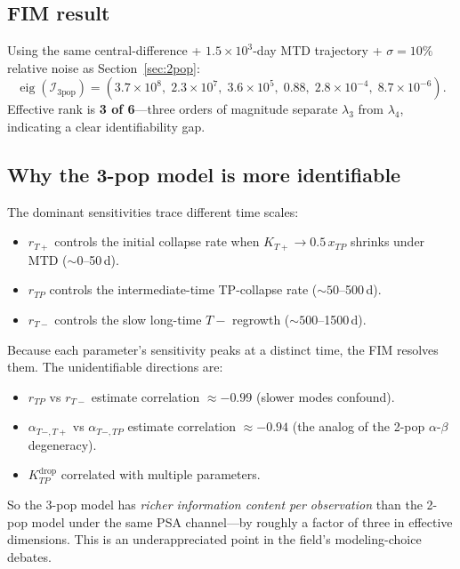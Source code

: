 \documentclass[11pt]{article}
\newcommand{\Kdrop}{K_{TP}^{\text{drop}}}
\newcommand{\Tplus}{T{+}}
\newcommand{\Tminus}{T{-}}
\begin{document}
\subsection{FIM result}

Using the same central-difference + $1.5 \times 10^3$-day MTD trajectory +
$\sigma = 10\%$ relative noise as Section~\ref{sec:2pop}:
\begin{equation}
\operatorname{eig}(\mathcal{I}_{3\text{pop}}) = (3.7 \times 10^8,\; 2.3 \times 10^7,\;
3.6 \times 10^5,\; 0.88,\; 2.8 \times 10^{-4},\; 8.7 \times 10^{-6}).
\label{eq:eig_3pop}
\end{equation}
Effective rank is \textbf{3 of 6}---three orders of magnitude separate
$\lambda_3$ from $\lambda_4$, indicating a clear identifiability gap.

\subsection{Why the 3-pop model is more identifiable}

The dominant sensitivities trace different time scales:
\begin{itemize}
\item $r_{\Tplus}$ controls the initial collapse rate when $K_{\Tplus} \to 0.5\,x_{TP}$ shrinks under MTD ($\sim 0$--50\,d).
\item $r_{TP}$ controls the intermediate-time TP-collapse rate ($\sim 50$--500\,d).
\item $r_{\Tminus}$ controls the slow long-time $\Tminus$ regrowth ($\sim 500$--1500\,d).
\end{itemize}

Because each parameter's sensitivity peaks at a distinct time, the FIM resolves
them. The unidentifiable directions are:
\begin{itemize}
\item $r_{TP}$ vs $r_{\Tminus}$ estimate correlation $\approx -0.99$ (slower modes confound).
\item $\alpha_{\Tminus,\Tplus}$ vs $\alpha_{\Tminus,TP}$ estimate correlation $\approx -0.94$ (the analog of the 2-pop $\alpha$-$\beta$ degeneracy).
\item $\Kdrop$ correlated with multiple parameters.
\end{itemize}

So the 3-pop model has \emph{richer information content per observation} than
the 2-pop model under the same PSA channel---by roughly a factor of three in
effective dimensions. This is an underappreciated point in the field's
modeling-choice debates.
\end{document}
